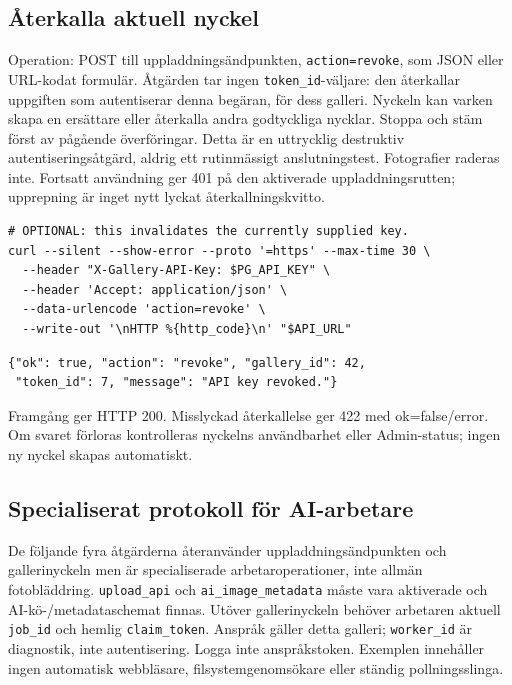 \documentclass[11pt,a4paper]{article}
\newcommand{\codeword}[1]{\nolinkurl{#1}}
\begin{document}
\subsection{\texorpdfstring{Återkalla aktuell nyckel}{Återkalla aktuell nyckel}}

\label{api352:revoke}

Operation: POST till uppladdningsändpunkten, \codeword{action=revoke}, som JSON eller
URL-kodat formulär. Åtgärden tar ingen \codeword{token_id}-väljare: den återkallar uppgiften
som autentiserar denna begäran, för dess galleri. Nyckeln kan varken skapa en ersättare
eller återkalla andra godtyckliga nycklar. Stoppa och stäm först av pågående överföringar.
Detta är en uttrycklig destruktiv autentiseringsåtgärd, aldrig ett rutinmässigt
anslutningstest. Fotografier raderas inte. Fortsatt användning ger 401 på den aktiverade
uppladdningsrutten; upprepning är inget nytt lyckat återkallningskvitto.

\begin{lstlisting}[language={}]
# OPTIONAL: this invalidates the currently supplied key.
curl --silent --show-error --proto '=https' --max-time 30 \
  --header "X-Gallery-API-Key: $PG_API_KEY" \
  --header 'Accept: application/json' \
  --data-urlencode 'action=revoke' \
  --write-out '\nHTTP %{http_code}\n' "$API_URL"
\end{lstlisting}

\begin{lstlisting}[language={}]
{"ok": true, "action": "revoke", "gallery_id": 42,
 "token_id": 7, "message": "API key revoked."}
\end{lstlisting}

Framgång ger HTTP 200. Misslyckad återkallelse ger 422 med ok=false/error. Om svaret
förloras kontrolleras nyckelns användbarhet eller Admin-status; ingen ny nyckel skapas
automatiskt.

\subsection{\texorpdfstring{Specialiserat protokoll för AI-arbetare}{Specialiserat protokoll för AI-arbetare}}

\label{api352:ai-contract}

De följande fyra åtgärderna återanvänder uppladdningsändpunkten och gallerinyckeln men är
specialiserade arbetaroperationer, inte allmän fotobläddring. \codeword{upload_api} och
\codeword{ai_image_metadata} måste vara aktiverade och AI-kö-/metadataschemat finnas. Utöver
gallerinyckeln behöver arbetaren aktuell \codeword{job_id} och hemlig
\codeword{claim_token}. Anspråk gäller detta galleri; \codeword{worker_id} är diagnostik,
inte autentisering. Logga inte anspråkstoken. Exemplen innehåller ingen automatisk
webbläsare, filsystemgenomsökare eller ständig pollningsslinga.
\end{document}
